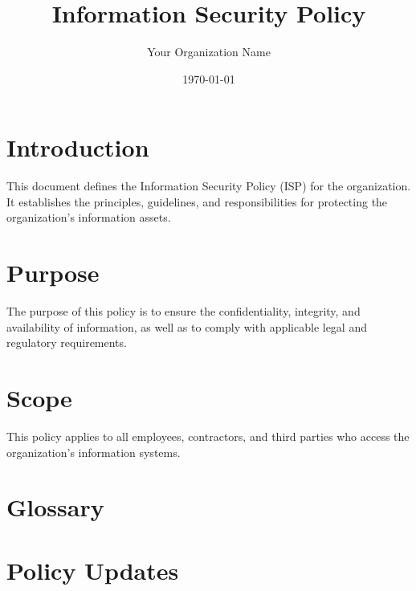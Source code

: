 \documentclass[a4paper,12pt]{article}
\title{Information Security Policy}
\author{Your Organization Name}
\date{\today}
\begin{document}
\maketitle

\tableofcontents
\newpage

\section{Introduction}
This document defines the Information Security Policy (ISP) for the organization. It establishes the principles, guidelines, and responsibilities for protecting the organization's information assets.

\section{Purpose}
The purpose of this policy is to ensure the confidentiality, integrity, and availability of information, as well as to comply with applicable legal and regulatory requirements.

\section{Scope}
This policy applies to all employees, contractors, and third parties who access the organization's information systems.

\section{Glossary}


\section{Policy Updates}

\end{document}
